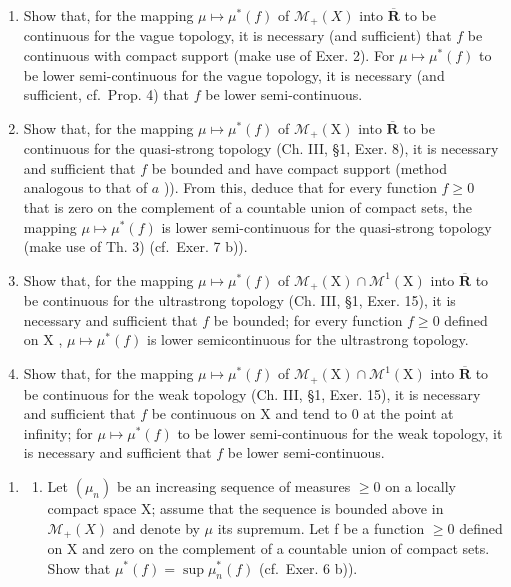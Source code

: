 \begin{enumerate}
\def\labelenumi{\alph{enumi})}
\item
  Show that, for the mapping \(\mu \mapsto \mu^{*}(f)\) of \(\mathcal{M}_{+}(X)\) into \(\overline{\mathbf{R}}\) to be continuous for the vague topology, it is necessary (and sufficient) that \(f\) be continuous with compact support (make use of Exer. 2). For \(\mu \mapsto \mu^{*}(f)\) to be lower semi-continuous for the vague topology, it is necessary (and sufficient, cf.~Prop. 4) that \(f\) be lower semi-continuous.
\item
  Show that, for the mapping \(\mu \mapsto \mu^{*}(f)\) of \(\mathcal{M}_{+}(\mathrm{X})\) into \(\overline{\mathbf{R}}\) to be continuous for the quasi-strong topology (Ch. III, §1, Exer. 8), it is necessary and sufficient that \(f\) be bounded and have compact support (method analogous to that of \(a\) )). From this, deduce that for every function \(f \geqslant 0\) that is zero on the complement of a countable union of compact sets, the mapping \(\mu \mapsto \mu^{*}(f)\) is lower semi-continuous for the quasi-strong topology (make use of Th. 3) (cf.~Exer. 7 b)).
\item
  Show that, for the mapping \(\mu \mapsto \mu^{*}(f)\) of \(\mathcal{M}_{+}(\mathrm{X}) \cap \mathcal{M}^{1}(\mathrm{X})\) into \(\overline{\mathbf{R}}\) to be continuous for the ultrastrong topology (Ch. III, §1, Exer. 15), it is necessary and sufficient that \(f\) be bounded; for every function \(f \geqslant 0\) defined on \(\mathrm{X}\) , \(\mu \mapsto \mu^{*}(f)\) is lower semicontinuous for the ultrastrong topology.
\item
  Show that, for the mapping \(\mu \mapsto \mu^{*}(f)\) of \(\mathcal{M}_{+}(\mathrm{X}) \cap \mathcal{M}^{1}(\mathrm{X})\) into \(\overline{\mathbf{R}}\) to be continuous for the weak topology (Ch. III, §1, Exer. 15), it is necessary and sufficient that \(f\) be continuous on \(\mathrm{X}\) and tend to 0 at the point at infinity; for \(\mu \mapsto \mu^{*}(f)\) to be lower semi-continuous for the weak topology, it is necessary and sufficient that \(f\) be lower semi-continuous.
\end{enumerate}

\begin{enumerate}
\def\labelenumi{\arabic{enumi})}
\setcounter{enumi}{6}
\tightlist
\item
  \begin{enumerate}
  \def\labelenumii{\alph{enumii})}
  \tightlist
  \item
    Let \((\mu_{n})\) be an increasing sequence of measures \(\geqslant0\) on a locally compact space X; assume that the sequence is bounded above in \(\mathcal{M}_{+}(X)\) and denote by \(\mu\) its supremum. Let f be a function \(\geqslant0\) defined on X and zero on the complement of a countable union of compact sets. Show that \(\mu^{*}(f)=\sup\mu_{n}^{*}(f)\) (cf.~Exer. 6 b)).
  \end{enumerate}
\end{enumerate}

